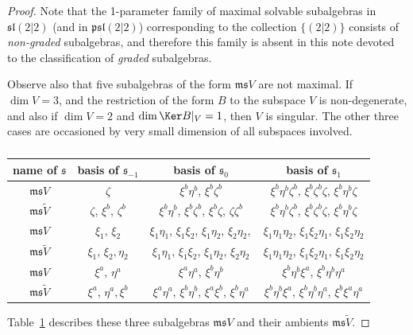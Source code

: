 \documentclass[10pt,a4paper]{amsart}
\newcommand {\fm} {{\mathfrak{m}}}
\newcommand {\fp} {{\mathfrak{p}}} %
\newcommand {\fs} {{\mathfrak{s}}}
\newcommand {\fsl} {{\mathfrak{sl}}}
\newcommand {\<} [2] {{\left.\vphantom{#2}\right.^{#1\!}\!{#2}}}
\numberwithin{equation}{section}
\begin{document}
\begin{proof}
Note that the 1-parameter family of maximal solvable subalgebras in $\fsl(2|2)$ (and in $\fp\fsl(2|2)$) corresponding to the collection $\{(2|2)\}$ consists of \textit{non-graded} subalgebras, and therefore this family is absent in this note devoted to the classification of
\textit{graded} subalgebras.

Observe also that five subalgebras of the form $\fm\fs V$ are not maximal. If $\dim V=3$, and the restriction of the form $B$ to the subspace $V$ is non-degenerate, and also if $\dim V=2$ and $\dim \Ker B|_V=1$, then $V$ is singular. The other three cases are occasioned by very small dimension of all subspaces involved.
\begin{table}[h]\centering\renewcommand{\arraystretch}{1.2}
\begin{tabular}{|c|c|c|c|}
\hline
name of $\fs$ & basis of $\fs_{-1}$ & basis of $\fs_0$ & basis of $\fs_1$\\
\hline
$\fm\fs V$ & $\zeta $ & $\xi^b\eta^b$, $\xi^b\zeta^b$ & $\xi^b\eta^b\zeta^b$, $\xi^b\zeta^b\zeta$, $\xi^b\eta^b\zeta$ \\
\hline
$\fm\fs \widetilde V$ & $\zeta$, $\xi^b$, $\zeta^b $ & $\xi^b\eta^b$, $\xi^b\zeta^b$, $\xi^b\zeta$, $\zeta\zeta^b$ & $\xi^b\eta^b\zeta^b$, $\xi^b\zeta^b\zeta$, $\xi^b\eta^b\zeta$ \\
\hline\hline
$\fm\fs V$ & $\xi_1$, $\xi_2$ & $\xi_1\eta_1$, $\xi_1\xi_2$, $\xi_1\eta_2$, $\xi_2\eta_2,$ & $\xi_1\eta_1\eta_2$, $\xi_1\xi_2\eta_1$, $\xi_1\xi_2\eta_2$ \\
\hline
$\fm\fs\widetilde V$ & $\xi_1$, $\xi_2,\eta_2 $ & $\xi_1\eta_1$, $\xi_1\xi_2$, $\xi_1\eta_2$, $\xi_2\eta_2$ & $\xi_1\eta_1\eta_2$, $\xi_1\xi_2\eta_1$, $\xi_1\xi_2\eta_2$ \\
\hline\hline
$\fm\fs V$ & $\xi^a$, $\eta^a$ & $\xi^a\eta^a$, $\xi^b\eta^b$ & $\xi^b\eta^b\xi^a$, $\xi^b\eta^b\eta^a$ \\
\hline
$\fm\fs\widetilde V$ & $\xi^a$, $\eta^a,\xi^b$ & $\xi^a\eta^a$, $\xi^b\eta^b$, $\xi^a\xi^b$, $\xi^b\eta^a$ & $\xi^b\eta^b\xi^a$, $\xi^b\eta^b\eta^a$, $\xi^b\xi^a\eta^a$ \\
\hline\hline
\end{tabular}
\caption{}\label{5sub}
\end{table}

Table~\ref{5sub} describes these three subalgebras
$\fm\fs V$ and their ambients $\fm\fs \widetilde V$.
\end{proof}
\end{document}
